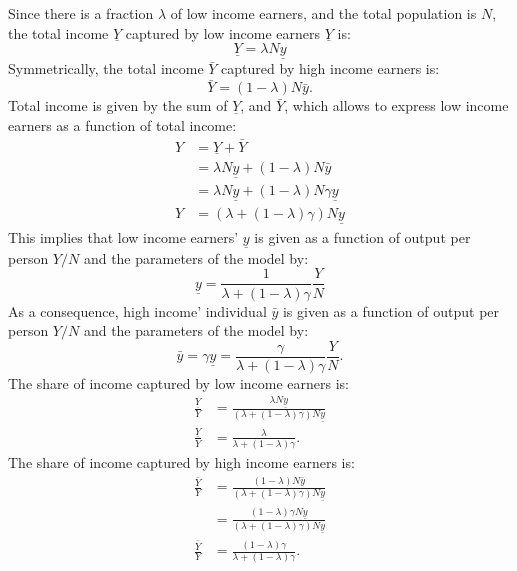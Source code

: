\documentclass[]{book}
\begin{document}
Since there is a fraction \(\lambda\) of low income earners, and the
total population is \(N\), the total income \(\underline{Y}\) captured
by low income earners \(\underline{Y}\) is:
\[\underline{Y} = \lambda N \underline y\] Symmetrically, the total
income \(\bar{Y}\) captured by high income earners is:
\[\bar{Y}=(1-\lambda)N \bar{y}.\] Total income is given by the sum of
\(\underline{Y}\), and \(\bar{Y}\), which allows to express low income
earners as a function of total income: \[
\begin{aligned}
Y&=\underline{Y} + \bar{Y}\\
&=\lambda N \underline{y}+(1-\lambda) N \bar{y}\\
&=\lambda N \underline{y}+(1-\lambda) N \gamma\underline{y}\\
Y&=\left(\lambda +(1-\lambda)\gamma\right)N\underline{y}
\end{aligned}
\] This implies that low income earners' \(\underline{y}\) is given as a
function of output per person \(Y/N\) and the parameters of the model
by: \[\underline{y}=\frac{1}{\lambda+(1-\lambda)\gamma}\frac{Y}{N}\] As
a consequence, high income' individual \(\bar{y}\) is given as a
function of output per person \(Y/N\) and the parameters of the model
by:
\[\bar{y}=\gamma\underline{y}=\frac{\gamma}{\lambda+(1-\lambda)\gamma}\frac{Y}{N}.\]
The share of income captured by low income earners is: \[
\begin{aligned}
\frac{\underline{Y}}{Y}&=\frac{\lambda N \underline{y}}{\left(\lambda +(1-\lambda)\gamma\right)N\underline{y}}\\
\frac{\underline{Y}}{Y}&=\frac{\lambda}{\lambda +(1-\lambda)\gamma}.
\end{aligned}
\] The share of income captured by high income earners is: \[
\begin{aligned}
\frac{\bar{Y}}{Y}&=\frac{(1-\lambda) N \bar{y}}{\left(\lambda +(1-\lambda)\gamma\right)N\underline{y}}\\
&=\frac{(1-\lambda)\gamma N \underline{y}}{\left(\lambda +(1-\lambda)\gamma\right)N\underline{y}}\\
\frac{\bar{Y}}{Y}&=\frac{(1-\lambda)\gamma}{\lambda +(1-\lambda)\gamma}.
\end{aligned}
\]
\end{document}
